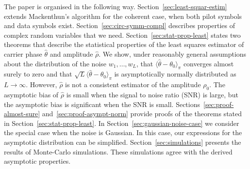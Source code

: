 \documentclass[journal]{IEEEtran}
\begin{document}
The paper is organised in the following way.  Section~\ref{sec:least-squar-estim} extends Mackenthun's algorithm for the coherent case, when both pilot symbols and data symbols exist.  Section~\ref{sec:circ-symm-compl} describes properties of complex random variables that we need.  Section~\ref{sec:stat-prop-least} states two theorems that describe the statistical properties of the least squares estimator of carrier phase $\hat{\theta}$ and amplitude $\hat{\rho}$.  We show, under reasonably general assumptions about the distribution of the noise $w_1,\dots,w_L$, that $\langle\hat{\theta} - \theta_0\rangle_\pi$ converges almost surely to zero and that $\sqrt{L}\langle\hat{\theta} - \theta_0\rangle_\pi$ is asymptotically normally distributed as $L\rightarrow \infty$.  However, $\hat{\rho}$ is not a consistent estimator of the amplitude $\rho_0$.  The asymptotic bias of $\hat{\rho}$ is small when the signal to noise ratio (SNR) is large, but the asymptotic bias is significant when the SNR is small.  Sections~\ref{sec:proof-almost-sure} and~\ref{sec:proof-asympt-norm} provide proofs of the theorems stated in Section~\ref{sec:stat-prop-least}.  In Section~\ref{sec:gaussian-noise-case} we consider the special case when the noise is Gaussian.  In this case, our expressions for the asymptotic distribution can be simplified.  Section~\ref{sec:simulations} presents the results of Monte-Carlo simulations.  These simulations agree with the derived asymptotic properties. 

\end{document}
